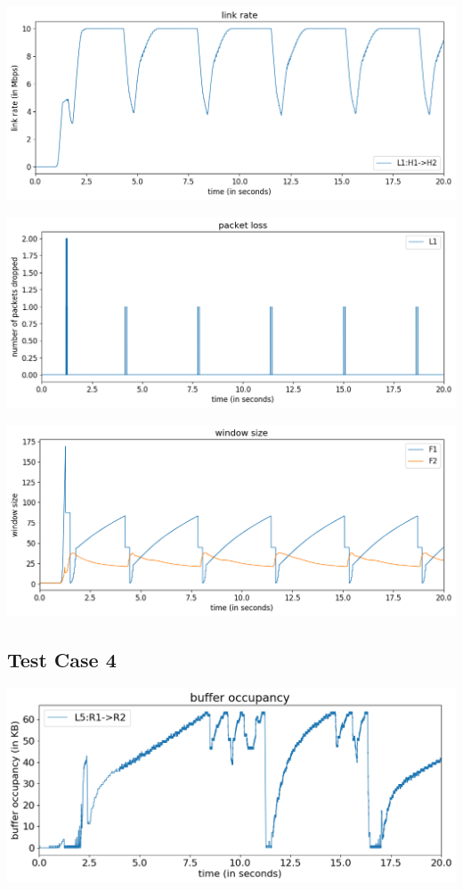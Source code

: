 \documentclass{article}
\begin{document}
\includegraphics[width = \textwidth]{"test_case3 link rate"}

\includegraphics[width = \textwidth]{"test_case3 packet loss"}

\includegraphics[width = \textwidth]{"test_case3 window size"}


\subsection{Test Case 4}


\includegraphics[width = \textwidth]{"test_case4 buffer occupancy"}
\end{document}
